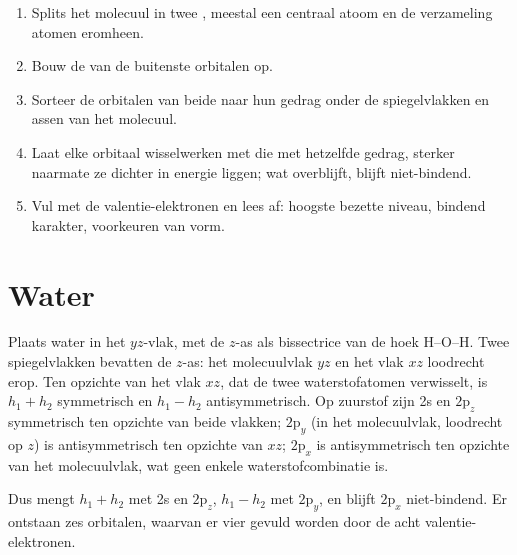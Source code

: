 \begin{method}\label{met:b2:fragment-orbitals:fragment-diagram}
\begin{enumerate}
  \item Splits het molecuul in twee , meestal een centraal atoom en de verzameling
        atomen eromheen.
  \item Bouw de  van de buitenste orbitalen op.
  \item Sorteer de orbitalen van beide  naar hun gedrag onder de spiegelvlakken
        en assen van het molecuul.
  \item Laat elke orbitaal wisselwerken met die met hetzelfde gedrag, sterker
        naarmate ze dichter in energie liggen; wat overblijft, blijft niet-bindend.
  \item Vul met de valentie-elektronen en lees af: hoogste bezette niveau,
        bindend karakter, voorkeuren van vorm.
\end{enumerate}
\end{method}

\section{Water}

Plaats water in het $yz$-vlak, met de $z$-as als bissectrice van de hoek H--O--H. Twee
spiegelvlakken bevatten de $z$-as: het molecuulvlak $yz$ en het vlak $xz$
loodrecht erop. Ten opzichte van het vlak $xz$, dat de twee
waterstofatomen verwisselt, is $h_1 + h_2$ symmetrisch en $h_1 - h_2$ antisymmetrisch. Op zuurstof zijn 2s en
$2\mathrm p_z$ symmetrisch ten opzichte van beide vlakken; $2\mathrm p_y$ (in het
molecuulvlak, loodrecht op $z$) is antisymmetrisch ten opzichte van $xz$;
$2\mathrm p_x$ is antisymmetrisch ten opzichte van het molecuulvlak, wat geen enkele
waterstofcombinatie is.

Dus mengt $h_1 + h_2$ met 2s en $2\mathrm p_z$, $h_1 - h_2$ met $2\mathrm p_y$, en
blijft $2\mathrm p_x$ niet-bindend. Er ontstaan zes orbitalen, waarvan er vier gevuld worden door de acht
valentie-elektronen.

